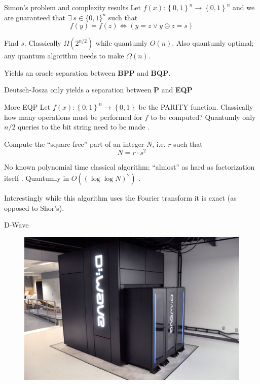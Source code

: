 \documentclass{beamer}
\begin{document}
\begin{frame}{Simon's problem and complexity results}
Let $f\left(x\right):\left\{ 0,1\right\} ^{n}\to\left\{ 0,1\right\}^n$ and we are guaranteed that $\exists ~ s\in \{0,1\}^n$ such that 
\[
  f\left(y\right)=f\left(z\right) \iff \left(y=z \vee y\oplus z = s\right)
\]

Find $s$. Classically $\Omega\left(2^{n/2}\right)$ while quantumly $O\left(n\right)$. Also quantumly optimal; any quantum algorithm
needs to make $\Omega\left(n\right)$. 

\vspace{\baselineskip}

Yields an oracle separation between \textbf{BPP} and \textbf{BQP}. 

\vspace{\baselineskip}



Deutsch-Josza only yields a separation between \textbf{P} and \textbf{EQP}

\end{frame}
\begin{frame}{More EQP}
Let $f\left(x\right):\left\{ 0,1\right\} ^{n}\to\left\{ 0,1\right\}$ be the PARITY function. Classically how many operations must be performed for $f$ to be computed?
Quantumly only $n/2$ queries to the bit string need to be made \cite{de2002quantum}.  

\vspace{\baselineskip}

Compute the ``square-free'' part of an integer $N$, i.e. $r$ such that
\[
N=r\cdot s^2
\]

No known polynomial time classical algorithm; ``almost'' as hard as factorization itself \cite{Okamoto98anew}. Quantumly in $O\left(\left(\log \log N\right)^2\right)$ \cite{li2012efficient}. 

\vspace{\baselineskip}


Interestingly while this algorithm uses the Fourier transform it is exact (as opposed to Shor's).

\end{frame}

\begin{frame}{D-Wave}
\begin{figure}
  \includegraphics[scale=.25]{pasted14}
\end{figure}
\end{frame}
\end{document}
